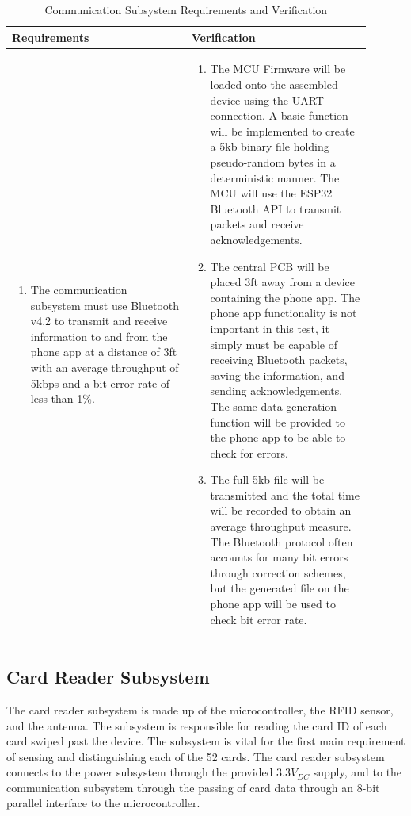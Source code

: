\documentclass[12pt]{article}
\begin{document}
\begin{table}[!h]
	\caption{Communication Subsystem Requirements and Verification}
	\label{tab:comms_rv}
	\centering
	\begin{tabular}{| p{0.45\linewidth} | p{0.45\linewidth} |} 
 		\hline
 		\textbf{Requirements} & \textbf{Verification} \\ 
 		\hline
 		\begin{enumerate}
 			\item The communication subsystem must use Bluetooth v4.2 \cite{IEEE_bt} to transmit and receive information to and from the phone app at a distance of 3ft with an average throughput of 5kbps and a bit error rate of less than 1\%.
		\end{enumerate} & \begin{enumerate}[label=\alph*)]
 			\item The MCU Firmware will be loaded onto the assembled device using the UART connection. A basic function will be implemented to create a 5kb binary file holding pseudo-random bytes in a deterministic manner. The MCU will use the ESP32 Bluetooth API to transmit packets and receive acknowledgements.
 			\item The central PCB will be placed 3ft away from a device containing the phone app. The phone app functionality is not important in this test, it simply must be capable of receiving Bluetooth packets, saving the information, and sending acknowledgements. The same data generation function will be provided to the phone app to be able to check for errors.
 			\item The full 5kb file will be transmitted and the total time will be recorded to obtain an average throughput measure. The Bluetooth protocol often accounts for many bit errors through correction schemes, but the generated file on the phone app will be used to check bit error rate.
		\end{enumerate} \\
 		\hline
	\end{tabular}
\end{table}

\subsection{Card Reader Subsystem}

The card reader subsystem is made up of the microcontroller, the RFID sensor, and the antenna. The subsystem is responsible for reading the card ID of each card swiped past the device. The subsystem is vital for the first main requirement of sensing and distinguishing each of the 52 cards. The card reader subsystem connects to the power subsystem through the provided $3.3V_{DC}$ supply, and to the communication subsystem through the passing of card data through an 8-bit parallel interface to the microcontroller.
\end{document}

